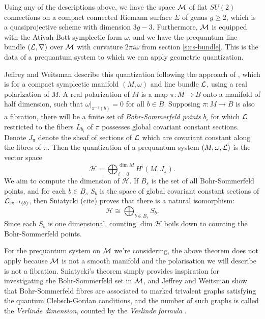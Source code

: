 
	Using any of the descriptions above, we have the space $\mathcal{M}$ of flat $SU(2)$ connections on a compact connected Riemann surface $\Sigma$ of genus $g\geq 2$, which is a quasiprojective scheme with dimension $3g-3$. Furthermore, $\mathcal{M}$ is equipped with the Atiyah-Bott symplectic form $\omega$, and we have the prequantum line bundle $(\mathcal{L},\nabla)$ over $\mathcal{M}$ with curvature $2\pi i \omega$ from section \ref{s:cs-bundle}. This is the data of a prequantum system to which we can apply geometric quantization.
	
	Jeffrey and Weitsman describe this quantization following the approach of \cite{weitsman_real_1992}, which is for a compact symplectic manifold $(M,\omega)$ and line bundle $\mathcal{L}$, using a real polarization of $M$. A real polarization of $M$ is a map $\pi:M\to B$ onto a manifold of half dimension, such that $\omega|_{\pi^{-1}(b)} =0$ for all $b\in B$. Supposing $\pi:M\to B$ is also a fibration, there will be a finite set of \textit{Bohr-Sommerfeld points} $b_i$ for which $\mathcal{L}$ restricted to the fibers $L_{b_i}$ of $\pi$ possesses global covariant constant sections. Denote $J_\pi$ denote the sheaf of sections of $\mathcal{L}$ which are covariant constant along the fibres of $\pi$. Then the quantization of a prequantum system $(M,\omega,\mathcal{L})$ is the vector space
	\begin{equation}
		\mathcal{H} = \bigoplus_{i=0}^{\dim M} H^i(M,J_\pi).
	\end{equation}
	We aim to compute the dimension of $\mathcal{H}$. If $B_s$ is the set of all Bohr-Sommerfeld points, and for each $b\in B_s$ $S_b$ is the space of global covariant constant sections of $\mathcal{L}|_{\pi^{-1}(b)}$, then Sniatycki (cite) proves that there is a natural isomorphism:
	\begin{equation}
		\mathcal{H} \cong \bigoplus_{b\in B_s} S_b.
	\end{equation}
	Since each $S_b$ is one dimensional, counting $\dim \mathcal{H}$ boils down to counting the Bohr-Sommerfeld points. 
	
	For the prequantum system on $\mathcal{M}$ we're considering, the above theorem does not apply because $\mathcal{M}$ is not a smooth manifold and the polarisation we will describe is not a fibration. Sniatycki's theorem simply provides inspiration for investigating the Bohr-Sommerfeld set in $\mathcal{M}$, and Jeffrey and Weitsman show that Bohr-Sommerfeld fibres are associated to marked trivalent graphs satisfying the quantum Clebsch-Gordan conditions, and the number of such graphs is called the \emph{Verlinde dimension}, counted by the \emph{Verlinde formula} \cite[Thm. 8.1]{jeffrey_bohr-sommerfeld_1992}.
	
